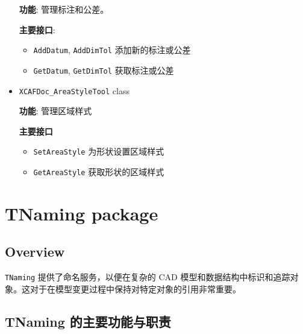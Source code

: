 \documentclass[11pt]{article}
\begin{document}
\begin{itemize}
\textbf{功能}: 管理标注和公差。

\textbf{主要接口}:

\begin{itemize}
\item \texttt{AddDatum}, \texttt{AddDimTol} 添加新的标注或公差
\item \texttt{GetDatum}, \texttt{GetDimTol} 获取标注或公差
\end{itemize}

\item \texttt{XCAFDoc\_AreaStyleTool} class

\textbf{功能}: 管理区域样式

\textbf{主要接口}

\begin{itemize}
\item \texttt{SetAreaStyle} 为形状设置区域样式
\item \texttt{GetAreaStyle} 获取形状的区域样式
\end{itemize}
\end{itemize}
\section{TNaming package}
\label{sec:orgf09fa18}

\subsection{Overview}
\label{sec:orgc09aba3}

\texttt{TNaming} 提供了命名服务，以便在复杂的 CAD 模型和数据结构中标识和追踪对象。这对于在模型变更过程中保持对特定对象的引用非常重要。
\subsection{TNaming 的主要功能与职责}
\label{sec:org20284c2}
\end{document}
